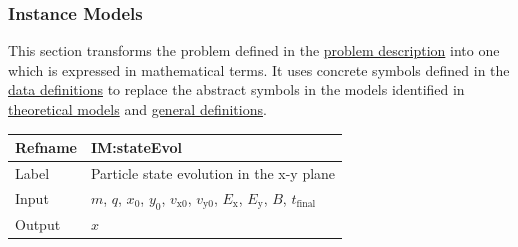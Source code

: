 \documentclass[12pt]{article}
\begin{document}
\subsubsection{Instance Models}
\label{Sec:IMs}
This section transforms the problem defined in the \hyperref[Sec:ProbDesc]{problem description} into one which is expressed in mathematical terms. It uses concrete symbols defined in the \hyperref[Sec:DDs]{data definitions} to replace the abstract symbols in the models identified in \hyperref[Sec:TMs]{theoretical models} and \hyperref[Sec:GDs]{general definitions}.

\medskip
\noindent
\begin{minipage}{\textwidth}
\begin{tabular}{>{\raggedright}p{}>{\raggedright\arraybackslash}p{}}
\toprule \textbf{Refname} & \textbf{IM:stateEvol}
\label{IM:stateEvol}
\\ \midrule
Label & Particle state evolution in the x-y plane
        
\\ \midrule
Input & $m$, $q$, ${x_{0}}$, ${y_{0}}$, ${v_{\text{x}0}}$, ${v_{\text{y}0}}$, ${E_{\text{x}}}$, ${E_{\text{y}}}$, $B$, ${t_{\text{final}}}$
        
\\ \midrule
Output & $x$
         

\end{tabular}
\end{minipage}
\end{document}

